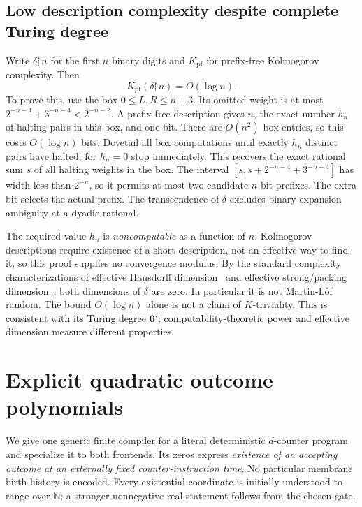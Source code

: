 \documentclass[11pt,letterpaper]{article}
\theoremstyle{definition}
\theoremstyle{remark}
\newcommand{\N}{\mathbb N}
\begin{document}
\subsection{Low description complexity despite complete Turing degree}
Write $\delta\mathord{\upharpoonright}n$ for the first $n$ binary digits and $K_{\mathrm{pf}}$ for prefix-free Kolmogorov complexity. Then
\begin{equation}\label{qoc:um:eq:complexity}
 K_{\mathrm{pf}}(\delta\mathord{\upharpoonright}n)=O(\log n).
\end{equation}
To prove this, use the box $0\leq L,R\leq n+3$. Its omitted weight is at most $2^{-n-4}+3^{-n-4}<2^{-n-2}$. A prefix-free description gives $n$, the exact number $h_n$ of halting pairs in this box, and one bit. There are $O(n^2)$ box entries, so this costs $O(\log n)$ bits. Dovetail all box computations until exactly $h_n$ distinct pairs have halted; for $h_n=0$ stop immediately. This recovers the exact rational sum $s$ of all halting weights in the box. The interval $[s,s+2^{-n-4}+3^{-n-4}]$ has width less than $2^{-n}$, so it permits at most two candidate $n$-bit prefixes. The extra bit selects the actual prefix. The transcendence of $\delta$ excludes binary-expansion ambiguity at a dyadic rational.

The required value $h_n$ is \emph{noncomputable} as a function of $n$. Kolmogorov descriptions require existence of a short description, not an effective way to find it, so this proof supplies no convergence modulus. By the standard complexity characterizations of effective Hausdorff dimension~\cite{um:Mayordomo} and effective strong/packing dimension~\cite{um:AHLM}, both dimensions of $\delta$ are zero. In particular it is not Martin-L\"of random. The bound $O(\log n)$ alone is not a claim of $K$-triviality. This is consistent with its Turing degree $\mathbf0'$; computability-theoretic power and effective dimension measure different properties.

\section{Explicit quadratic outcome polynomials}\label{qoc:um:sec:quadratic}
We give one generic finite compiler for a literal deterministic $d$-counter program and specialize it to both frontends. Its zeros express \emph{existence of an accepting outcome at an externally fixed counter-instruction time}. No particular membrane birth history is encoded. Every existential coordinate is initially understood to range over $\N$; a stronger nonnegative-real statement follows from the chosen gate.
\end{document}
